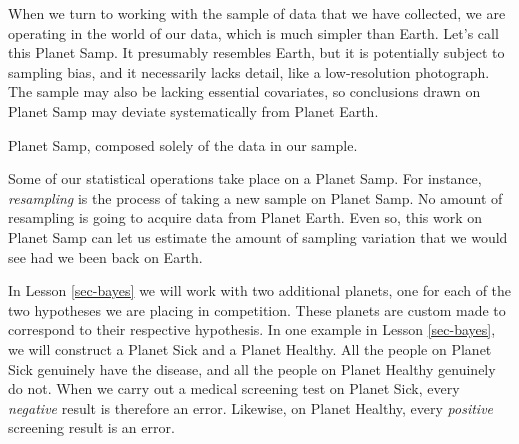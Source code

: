 \documentclass[
  letterpaper,
  DIV=11,
  numbers=noendperiod,
  oneside]{scrartcl}
\begin{document}
When we turn to working with the sample of data that we have collected,
we are operating in the world of our data, which is much simpler than
Earth. Let's call this Planet Samp. It presumably resembles Earth, but
it is potentially subject to sampling bias, and it necessarily lacks
detail, like a low-resolution photograph. The sample may also be lacking
essential covariates, so conclusions drawn on Planet Samp may deviate
systematically from Planet Earth.

\begin{marginfigure}


\caption{\label{fig-planet-earth}Planet Samp, composed solely of the
data in our sample.}

\end{marginfigure}%

Some of our statistical operations take place on a Planet Samp. For
instance, \emph{resampling} is the process of taking a new sample on
Planet Samp. No amount of resampling is going to acquire data from
Planet Earth. Even so, this work on Planet Samp can let us estimate the
amount of sampling variation that we would see had we been back on
Earth.

In Lesson \ref{sec-bayes} we will work with two additional planets, one
for each of the two hypotheses we are placing in competition. These
planets are custom made to correspond to their respective hypothesis. In
one example in Lesson \ref{sec-bayes}, we will construct a Planet Sick
and a Planet Healthy. All the people on Planet Sick genuinely have the
disease, and all the people on Planet Healthy genuinely do not. When we
carry out a medical screening test on Planet Sick, every \emph{negative}
result is therefore an error. Likewise, on Planet Healthy, every
\emph{positive} screening result is an error.
\end{document}
